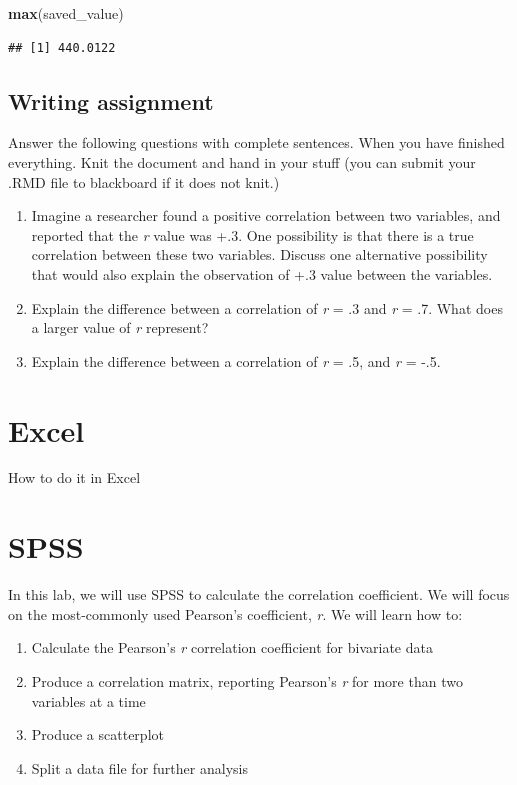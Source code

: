 \documentclass[]{book}
\newenvironment{Shaded}{\begin{snugshade}}{\end{snugshade}}
\newcommand{\KeywordTok}[1]{\textcolor[rgb]{0.13,0.29,0.53}{\textbf{#1}}}
\newcommand{\NormalTok}[1]{#1}
\providecommand{\tightlist}{%
  \setlength{\itemsep}{0pt}\setlength{\parskip}{0pt}}
\begin{document}
\begin{Shaded}
\begin{Highlighting}[]
\KeywordTok{max}\NormalTok{(saved_value)}
\end{Highlighting}
\end{Shaded}

\begin{verbatim}
## [1] 440.0122
\end{verbatim}

\subsection{Writing assignment}\label{writing-assignment-2}

Answer the following questions with complete sentences. When you have
finished everything. Knit the document and hand in your stuff (you can
submit your .RMD file to blackboard if it does not knit.)

\begin{enumerate}
\def\labelenumi{\arabic{enumi}.}
\item
  Imagine a researcher found a positive correlation between two
  variables, and reported that the \emph{r} value was +.3. One
  possibility is that there is a true correlation between these two
  variables. Discuss one alternative possibility that would also explain
  the observation of +.3 value between the variables.
\item
  Explain the difference between a correlation of \emph{r} = .3 and
  \emph{r} = .7. What does a larger value of \emph{r} represent?
\item
  Explain the difference between a correlation of \emph{r} = .5, and
  \emph{r} = -.5.
\end{enumerate}

\section{Excel}\label{excel-3}

How to do it in Excel

\section{SPSS}\label{spss-3}

In this lab, we will use SPSS to calculate the correlation coefficient.
We will focus on the most-commonly used Pearson's coefficient, \emph{r}.
We will learn how to:

\begin{enumerate}
\def\labelenumi{\arabic{enumi}.}
\tightlist
\item
  Calculate the Pearson's \emph{r} correlation coefficient for bivariate
  data
\item
  Produce a correlation matrix, reporting Pearson's \emph{r} for more
  than two variables at a time
\item
  Produce a scatterplot
\item
  Split a data file for further analysis
\end{enumerate}
\end{document}
